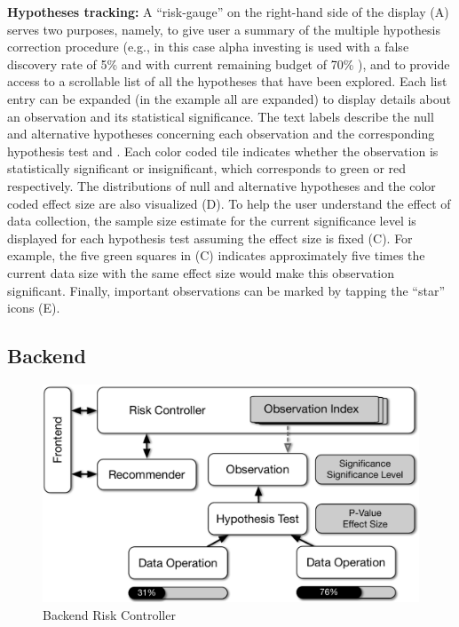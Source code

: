 \textbf{Hypotheses tracking:} A ``risk-gauge'' on the right-hand side of the display (A) serves two purposes, namely, to give user a summary of the multiple hypothesis correction procedure (e.g., in this case alpha investing is used with a false discovery rate of 5\% and with current remaining budget of 70\% ), and to provide access to a scrollable list of all the hypotheses that have been explored.
Each list entry can be expanded (in the example all are expanded) to display details about an observation and its statistical significance.  
The text labels describe the null and alternative hypotheses concerning each observation and the corresponding hypothesis test and \pval{}. Each color coded tile indicates whether the observation is statistically significant or insignificant, which corresponds to green or red respectively.  
The distributions of null and alternative hypotheses and the color coded effect size are also visualized (D).  
To help the user understand the effect of data collection, the sample size estimate for the current significance level is displayed for each hypothesis test assuming the effect size is fixed (C).  
For example, the five green squares in (C) indicates approximately five times the current data size with the same effect size would make this observation significant.
Finally, important observations can be marked by tapping the ``star'' icons (E).

\subsection{Backend}
\label{sec:backend}

\begin{figure}
\centering
\includegraphics[scale=0.4]{figures/risk-controller.pdf}
\caption{Backend Risk Controller}
\label{fig:backend}	
\end{figure}

